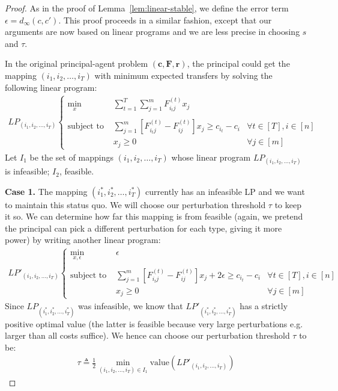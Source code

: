 \documentclass{article}
\newcommand{\dist}[3]{d_{#3}\left(#1, #2\right)}
\newcommand{\costvector}{\bm{c}}
\newcommand{\ForecastTensor}{\bm{F}}
\newcommand{\rewardvector}{\bm{r}}
\newcommand{\PrincipalAgentProblem}{\left(\costvector, \ForecastTensor, \rewardvector\right)}
\newcommand{\actionmapping}{(i_1, i_2, \ldots, i_T)}
\newcommand{\optactionmapping}{(i^*_1, i^*_2, \ldots, i^*_T)}
\begin{document}
\begin{proof}
  As in the proof of Lemma~\ref{lem:linear-stable}, we define the error term $\epsilon = \dist{c}{c'}{\infty}$. This proof proceeds in a similar fashion, except that our arguments are now based on linear programs and we are less precise in choosing $s$ and $\tau$.
  
  In the original principal-agent problem $\PrincipalAgentProblem$, the principal could get the mapping $\actionmapping$ with minimum expected transfers by solving the following linear program:
  \begin{align*}
  LP_{\actionmapping} \left\{
    \begin{array}{rll}
                  \min_x & \sum_{t=1}^T \sum_{j=1}^m F^{(t)}_{i_t j} x_j \\
      \\
      \text{subject to } & \sum_{j=1}^m \left[ F^{(t)}_{i_tj} - F^{(t)}_{ij} \right] x_j \ge c_{i_t} - c_i & \forall t \in [T], i \in [n] \\
                         & x_j \ge 0                                                                       & \forall j \in [m]
    \end{array}
  \right.
  \end{align*}
  Let $I_1$ be the set of mappings $\actionmapping$ whose linear program $LP_{\actionmapping}$ is infeasible; $I_2$, feasible.
  
  \textbf{Case 1.} The mapping $\optactionmapping$ currently has an infeasible LP and we want to maintain this status quo. We will choose our perturbation threshold $\tau$ to keep it so. We can determine how far this mapping is from feasible (again, we pretend the principal can pick a different perturbation for each type, giving it more power) by writing another linear program:
  \begin{align*}
  LP'_{\actionmapping} \left\{
    \begin{array}{rll}
      \min_{x, \epsilon} & \epsilon \\ 
      \\
      \text{subject to } & \sum_{j=1}^m \left[ F^{(t)}_{i_tj} - F^{(t)}_{ij} \right] x_j + 2 \epsilon \ge c_{i_t} - c_i & \forall t \in [T], i \in [n] \\
                         & x_j \ge 0                                                                                    & \forall j \in [m]
    \end{array}
  \right.
  \end{align*}
  Since $LP_{\optactionmapping}$ was infeasible, we know that $LP'_{\optactionmapping}$ has a strictly positive optimal value (the latter is feasible because very large perturbations e.g. larger than all costs suffice). We hence can choose our perturbation threshold $\tau$ to be:
  \begin{align*}
    \tau \triangleq \frac12 \min_{\actionmapping \in I_1} \text{value}(LP'_{\actionmapping})
  \end{align*}
  

\end{proof}
\end{document}
